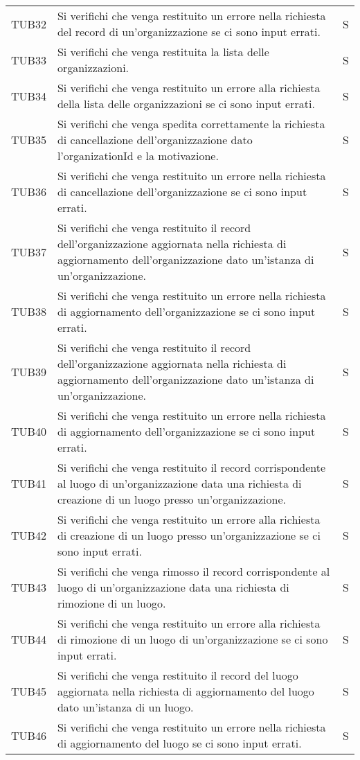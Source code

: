 {\begin{longtable}{ c C{13cm} C{1cm}}
TUB32 & Si verifichi che venga restituito un errore nella richiesta del record di un'organizzazione se ci sono input errati. & S \\
TUB33 & Si verifichi che venga restituita la lista delle organizzazioni. & S \\
TUB34 & Si verifichi che venga restituito un errore alla richiesta della lista delle organizzazioni se ci sono input errati. & S \\
TUB35 & Si verifichi che venga spedita correttamente la richiesta di cancellazione dell'organizzazione dato l'organizationId e la motivazione. & S \\
TUB36 & Si verifichi che venga restituito un errore nella richiesta di cancellazione dell'organizzazione se ci sono input errati. & S \\
TUB37 & Si verifichi che venga restituito il record dell'organizzazione aggiornata nella richiesta di aggiornamento dell'organizzazione dato un'istanza di un'organizzazione. & S \\
TUB38 & Si verifichi che venga restituito un errore nella richiesta di aggiornamento dell'organizzazione se ci sono input errati. & S \\
TUB39 & Si verifichi che venga restituito il record dell'organizzazione aggiornata nella richiesta di aggiornamento dell'organizzazione dato un'istanza di un'organizzazione. & S \\
TUB40 & Si verifichi che venga restituito un errore nella richiesta di aggiornamento dell'organizzazione se ci sono input errati. & S \\
TUB41 & Si verifichi che venga restituito il record corrispondente al luogo di un'organizzazione data una richiesta di creazione di un luogo presso un'organizzazione. & S \\
TUB42 & Si verifichi che venga restituito un errore alla richiesta di creazione di un luogo presso un'organizzazione se ci sono input errati. & S \\
TUB43 & Si verifichi che venga rimosso il record corrispondente al luogo di un'organizzazione data una richiesta di rimozione di un luogo. & S \\
TUB44 & Si verifichi che venga restituito un errore alla richiesta di rimozione di un luogo di un'organizzazione se ci sono input errati. & S \\
TUB45 & Si verifichi che venga restituito il record del luogo aggiornata nella richiesta di aggiornamento del luogo dato un'istanza di un luogo. & S \\
TUB46 & Si verifichi che venga restituito un errore nella richiesta di aggiornamento del luogo se ci sono input errati. & S \\

\end{longtable}}
